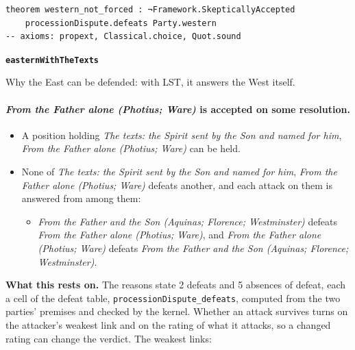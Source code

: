 \documentclass[11pt,paper=\testimonypaper,DIV=13,parskip=false]{scrartcl}
\begin{document}
{\small\begin{verbatim}
theorem western_not_forced : ¬Framework.SkepticallyAccepted
    processionDispute.defeats Party.western
-- axioms: propext, Classical.choice, Quot.sound
\end{verbatim}}
\par\medskip\noindent\textbf{\texttt{eastern\allowbreak{}With\allowbreak{}The\allowbreak{}Texts}}\par\nobreak\noindent
Why the East can be defended: with LST, it answers the West itself.

\paragraph{\emph{From the Father alone (Photius; Ware)} is accepted on some resolution.}
\begin{itemize}
\item A position holding \emph{The texts: the Spirit sent by the Son and named for him}, \emph{From the Father alone (Photius; Ware)} can be held.
\item None of \emph{The texts: the Spirit sent by the Son and named for him}, \emph{From the Father alone (Photius; Ware)} defeats another, and each attack on them is answered from among them:
\begin{itemize}
\item \emph{From the Father and the Son (Aquinas; Florence; Westminster)} defeats \emph{From the Father alone (Photius; Ware)}, and \emph{From the Father alone (Photius; Ware)} defeats \emph{From the Father and the Son (Aquinas; Florence; Westminster)}.
\end{itemize}
\end{itemize}
\par\noindent\textbf{What this rests on.} The reasons state 2 defeats and 5 absences of defeat, each a cell of the defeat table, \texttt{procession\allowbreak{}Dispute\_\allowbreak{}defeats}, computed from the two parties' premises and checked by the kernel. Whether an attack survives turns on the attacker's weakest link and on the rating of what it attacks, so a changed rating can change the verdict. The weakest links:
\end{document}
